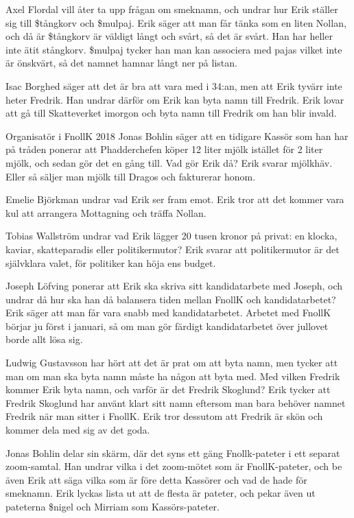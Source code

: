 \documentclass[hidelinks]{sektionsmote}
\begin{document}
Axel Flordal vill åter ta upp frågan om smeknamn, och undrar hur Erik ställer sig till \$tångkorv och \$mulpaj.
Erik säger att man får tänka som en liten Nollan, och då är \$tångkorv är väldigt långt och svårt, så det är svårt.
Han har heller inte ätit stångkorv.
\$mulpaj tycker han man kan associera med pajas vilket inte är önskvärt, så det namnet hamnar långt ner på listan.\par
Isac Borghed säger att det är bra att vara med i 34:an, men att Erik tyvärr inte heter Fredrik.
Han undrar därför om Erik kan byta namn till Fredrik.
Erik lovar att gå till Skatteverket imorgon och byta namn till Fredrik om han blir invald.\par
Organisatör i FnollK 2018 Jonas Bohlin säger att en tidigare Kassör som han har på tråden ponerar att Phadderchefen köper 12 liter mjölk istället för 2 liter mjölk, och sedan gör det en gång till.
Vad gör Erik då?
Erik svarar mjölkhäv.
Eller så säljer man mjölk till Dragos och fakturerar honom.\par
Emelie Björkman undrar vad Erik ser fram emot.
Erik tror att det kommer vara kul att arrangera Mottagning och träffa Nollan.\par
Tobias Wallström undrar vad Erik lägger 20 tusen kronor på privat: en klocka, kaviar, skatteparadis eller politikermutor?
Erik svarar att politikermutor är det självklara valet, för politiker kan höja ens budget.\par
Joseph Löfving ponerar att Erik ska skriva sitt kandidatarbete med Joseph, och undrar då hur ska han då balansera tiden mellan FnollK och kandidatarbetet?
Erik säger att man får vara snabb med kandidatarbetet.
Arbetet med FnollK börjar ju först i januari, så om man gör färdigt kandidatarbetet över jullovet borde allt lösa sig.\par
Ludwig Gustavsson har hört att det är prat om att byta namn, men tycker att man om man ska byta namn måste ha någon att byta med.
Med vilken Fredrik kommer Erik byta namn, och varför är det Fredrik Skoglund?
Erik tycker att Fredrik Skoglund har använt klart sitt namn eftersom man bara behöver namnet Fredrik när man sitter i FnollK.
Erik tror dessutom att Fredrik är skön och kommer dela med sig av det goda.\par
Jonas Bohlin delar sin skärm, där det syns ett gäng Fnollk-pateter i ett separat zoom-samtal.
Han undrar vilka i det zoom-mötet som är FnollK-pateter, och be även Erik att säga vilka som är före detta Kassörer och vad de hade för smeknamn.
Erik lyckas lista ut att de flesta är pateter, och pekar även ut pateterna \$nigel och Mirriam som Kassörs-pateter.
\end{document}
